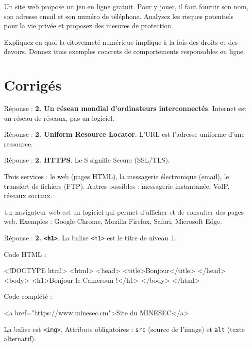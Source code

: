 \exo{}
Un site web propose un jeu en ligne gratuit. Pour y jouer, il faut fournir son nom, son adresse email et son numéro de téléphone. Analysez les risques potentiels pour la vie privée et proposez des mesures de protection.

\exo{}
Expliquez en quoi la citoyenneté numérique implique à la fois des droits et des devoirs. Donnez trois exemples concrets de comportements responsables en ligne.

\section{Corrigés}

Réponse : \textbf{2. Un réseau mondial d'ordinateurs interconnectés}. Internet est un réseau de réseaux, pas un logiciel.

Réponse : \textbf{2. Uniform Resource Locator}. L'URL est l'adresse uniforme d'une ressource.

Réponse : \textbf{2. HTTPS}. Le S signifie Secure (SSL/TLS).

Trois services : le web (pages HTML), la messagerie électronique (email), le transfert de fichiers (FTP). Autres possibles : messagerie instantanée, VoIP, réseaux sociaux.

Un navigateur web est un logiciel qui permet d'afficher et de consulter des pages web. Exemples : Google Chrome, Mozilla Firefox, Safari, Microsoft Edge.

Réponse : \textbf{2. \texttt{<h1>}}. La balise \texttt{<h1>} est le titre de niveau 1.

Code HTML :
\begin{ccode}
<!DOCTYPE html>
<html>
  <head>
    <title>Bonjour</title>
  </head>
  <body>
    <h1>Bonjour le Cameroun !</h1>
  </body>
</html>
\end{ccode}

Code complété :
\begin{ccode}
<a href="https://www.minesec.cm">Site du MINESEC</a>
\end{ccode}

La balise est \texttt{<img>}. Attributs obligatoires : \texttt{src} (source de l'image) et \texttt{alt} (texte alternatif).

